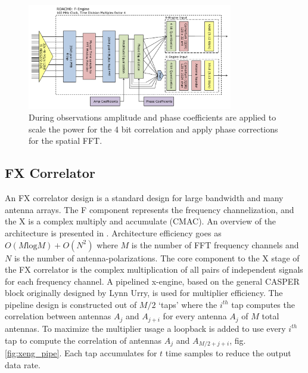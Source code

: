 \documentclass[useAMS,macros,usenatbib]{mn2e}
\begin{document}
\begin{figure}
    \centering
    \includegraphics[width=0.8\textwidth]{graphics/crop_fengine_block.pdf}
    \caption{During observations amplitude and phase coefficients are applied to scale the power for the 4 bit correlation and apply phase corrections for the spatial FFT.}
    \label{fig:feng_block}
\end{figure}

\subsection{FX Correlator}
\label{correlator}

An FX correlator design is a standard design for large bandwidth and many antenna arrays.
The F component represents the frequency channelization, and the X is a complex multiply and accumulate (CMAC).
An overview of the architecture is presented in \cite{romney_white_book}.
Architecture efficiency goes as $O( M \textrm{log} M) + O( N^2)$ where $M$ is the number of FFT frequency channels and $N$ is the number of antenna-polarizations.
The core component to the X stage of the FX correlator is the complex multiplication of all pairs of independent signals for each frequency channel.
A pipelined x-engine, based on the general CASPER block originally designed by Lynn Urry\citep{fxcorrelator}, is used for multiplier efficiency.
The pipeline design is constructed out of $M/2$ `taps' where the $i^{th}$ tap computes the correlation between antennas $A_j$ and $A_{j+i}$ for every antenna $A_j$ of $M$ total antennas.
To maximize the multiplier usage a loopback is added to use every $i^{th}$ tap to compute the correlation of antennas $A_j$ and $A_{M/2+j+i}$, fig. \ref{fig:xeng_pipe}.
Each tap accumulates for $t$ time samples to reduce the output data rate.
\end{document}
